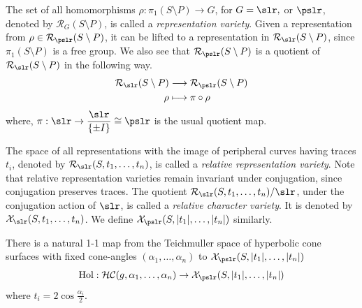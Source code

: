 The set of all homomorphisms $\rho: \pi_1(S \setminus P) \rightarrow G$, for $G = \slr,$ or $\pslr$, denoted by  $\mathcal{R}_G(S \setminus P)$, is called a \textit{representation variety}. Given a representation from $\rho\in \mathcal{R}_{\pslr}(S \setminus P)$, it can be lifted to a representation in $\mathcal{R}_{\slr}(S \setminus P)$, since $\pi_1(S \setminus P)$ is a free group. We also see that $\mathcal{R}_{\pslr}(S \setminus P)$ is a quotient of $\mathcal{R}_{\slr}(S \setminus P)$ in the following way.
	\begin{align*}
\mathcal{R}_{\slr}(S \setminus P) &\longrightarrow \mathcal{R}_{\pslr}(S \setminus P) \\
	\rho &\longmapsto \pi \circ \rho
\end{align*}
where, $\pi: \slr \rightarrow \dfrac{\slr}{\{\pm I\}} \cong \pslr$ is the usual quotient map.

 The space of all representations with the image of peripheral curves having traces $t_i$, denoted by $\mathcal{R}_{\slr}(S,t_1,\ldots,t_n)$, is called a \textit{relative representation variety}. Note that relative representation varieties remain invariant under conjugation, since conjugation preserves traces. The quotient $\mathcal{R}_{\slr}(S,t_1,\ldots,t_n) / \slr$, under the conjugation action of $\slr$, is called a \textit{relative character variety}. It is denoted by $\mathcal{X}_{\slr}(S, t_1, \ldots, t_n)$. We define $\mathcal{X}_{\pslr}(S, |t_1|,\ldots,|t_n|)$ similarly. 
 


\begin{prop}\label{prop:HolMap}
	There is a natural 1-1 map from the Teichmuller space of hyperbolic cone surfaces with fixed cone-angles $(\alpha_1, \ldots, \alpha_n)$ to $\mathcal{X}_{\pslr}(S, |t_1|,\dots,|t_n|)$
	\[\text{Hol}: \mathcal{HC}(g,\alpha_1,\ldots,\alpha_n) \rightarrow \mathcal{X}_{\pslr}(S, |t_1|,\dots,|t_n|) \]
	where $t_i = 2\cos{\frac{\alpha_i}{2}}.$
\end{prop}

